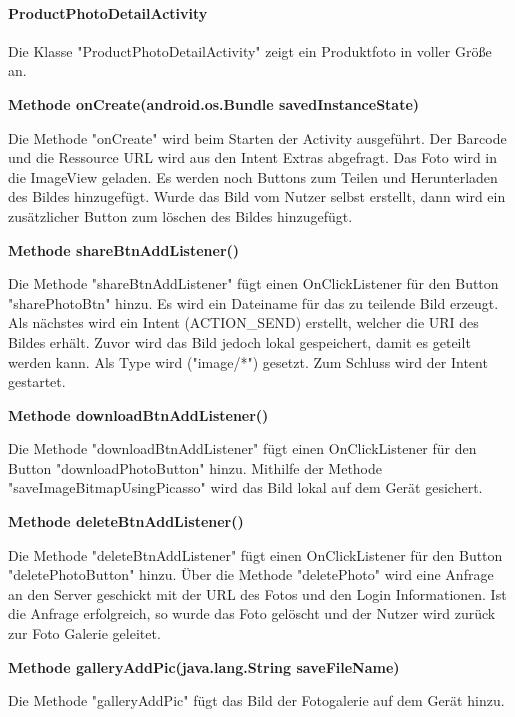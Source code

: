 \documentclass{scrartcl}
\begin{document}
\paragraph{ProductPhotoDetailActivity} 
Die Klasse "ProductPhotoDetailActivity" zeigt ein Produktfoto in voller Größe an. \newline 

\noindent\textbf{Methode onCreate(android.os.Bundle savedInstanceState)}

\noindent Die Methode "onCreate" wird beim Starten der Activity ausgeführt. Der Barcode und die Ressource URL wird aus den Intent Extras abgefragt. Das Foto wird in die ImageView geladen. Es werden noch Buttons zum Teilen und Herunterladen des Bildes hinzugefügt. Wurde das Bild vom Nutzer selbst erstellt, dann wird ein zusätzlicher Button zum löschen des Bildes hinzugefügt. \newline

\noindent\textbf{Methode shareBtnAddListener()}

\noindent Die Methode "shareBtnAddListener" fügt einen OnClickListener für den Button "sharePhotoBtn" hinzu. Es wird ein Dateiname für das zu teilende Bild erzeugt. Als nächstes wird ein Intent (ACTION\_SEND) erstellt, welcher die URI des Bildes erhält. Zuvor wird das Bild jedoch lokal gespeichert, damit es geteilt werden kann. Als Type wird ("image/*") gesetzt. Zum Schluss wird der Intent gestartet. \newline 

\noindent\textbf{Methode downloadBtnAddListener()}

\noindent Die Methode "downloadBtnAddListener" fügt einen OnClickListener für den Button "downloadPhotoButton" hinzu. Mithilfe der Methode "saveImageBitmapUsingPicasso" wird das Bild lokal auf dem Gerät gesichert. \newline 

\noindent\textbf{Methode deleteBtnAddListener()}

\noindent Die Methode "deleteBtnAddListener" fügt einen OnClickListener für den Button "deletePhotoButton" hinzu. Über die Methode "deletePhoto" wird eine Anfrage an den Server geschickt mit der URL des Fotos und den Login Informationen. Ist die Anfrage erfolgreich, so wurde das Foto gelöscht und der Nutzer wird zurück zur Foto Galerie geleitet. \newline

\noindent\textbf{Methode galleryAddPic(java.lang.String saveFileName)}

\noindent Die Methode "galleryAddPic" fügt das Bild der Fotogalerie auf dem Gerät hinzu. \newline
\end{document}
